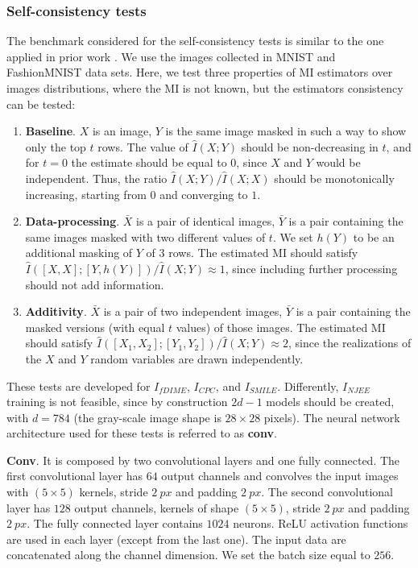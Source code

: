 \subsubsection{Self-consistency tests}
\label{subsec:mi_appendix_consistency_tests}
The benchmark considered for the self-consistency tests is similar to the one applied in prior work \cite{Song2020}. We use the images collected in MNIST \cite{deng2012mnist} and FashionMNIST \cite{xiao2017fashion} data sets. Here, we test three properties of MI estimators over images distributions, where the MI is not known, but the estimators consistency can be tested:
\begin{enumerate}
    \item \textbf{Baseline}. $X$ is an image, $Y$ is the same image masked in such a way to show only the top $t$ rows. The value of $\hat{I}(X;Y)$ should be non-decreasing in $t$, and for $t=0$ the estimate should be equal to 0, since $X$ and $Y$ would be independent. Thus, the ratio $\hat{I}(X;Y)/\hat{I}(X;X)$ should be monotonically increasing, starting from $0$ and converging to $1$.  
    \item \textbf{Data-processing}. $\bar{X}$ is a pair of identical images, $\bar{Y}$ is a pair containing the same images masked with two different values of $t$. We set $h(Y)$ to be an additional masking of $Y$ of $3$ rows. The estimated MI should satisfy $\hat{I}([X,X];[Y, h(Y)])/\hat{I}(X;Y) \approx 1$, since including further processing should not add information.  
    \item \textbf{Additivity}. $\bar{X}$ is a pair of two independent images, $\bar{Y}$ is a pair containing the masked versions (with equal $t$ values) of those images. The estimated MI should satisfy $\hat{I}([X_1,X_2];[Y_1, Y_2])/\hat{I}(X;Y) \approx 2$, since the realizations of the $X$ and $Y$ random variables are drawn independently. 
\end{enumerate}
These tests are developed for $I_{fDIME}$, $I_{CPC}$, and $I_{SMILE}$. Differently, $I_{NJEE}$ training is not feasible, since by construction $2d-1$ models should be created, with $d=784$ (the gray-scale image shape is $28 \times 28$ pixels).
The neural network architecture used for these tests is referred to as \textbf{conv}.

\textbf{Conv}. It is composed by two convolutional layers and one fully connected. The first convolutional layer has $64$ output channels and convolves the input images with $(5 \times 5)$ kernels, stride $2 \> px$ and padding $2 \> px$. The second convolutional layer has $128$ output channels, kernels of shape $(5 \times 5)$, stride $2 \> px$ and padding $2 \> px$. The fully connected layer contains $1024$ neurons. ReLU activation functions are used in each layer (except from the last one). The input data are concatenated along the channel dimension.  We set the batch size equal to $256$.

